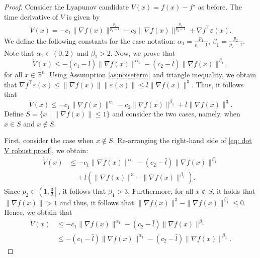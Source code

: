 \documentclass[letterpaper]{article}
\begin{document}
\begin{proof}
Consider the Lyapunov candidate $V(x)=f(x)-f^\star$ as before. The time derivative of $V$ is given by
\begin{align*}
\dot{V}(x) = -c_1\|\nabla f(x)\|^{\frac{p_1}{p_1-1}}-c_2\|\nabla f(x)\|^{\frac{p_2}{p_2-1}}+\nabla f^\intercal \varepsilon(x).
\end{align*}
We define the following constants for the ease notation: $\alpha_1= \frac{p_1}{p_1 -1}$, $\beta_1= \frac{p_2}{p_2 -1}$. Note that $\alpha_1 \in (0,2)$ and $\beta_1 >2$.
Now, we prove that
\begin{equation} \label{eq:robust_bound}
\dot{V}(x)\leq -(c_1 -\bar{l})\|\nabla f(x)\|^{\alpha_1} -(c_2 -\bar{l})\|\nabla f(x)\|^{\beta_1},
\end{equation}
for all $x\in \mathbb{R}^n$.
Using Assumption \ref{as:noiseterm} and triangle inequality, we obtain that $\nabla f^\intercal \varepsilon(x)\leq \|\nabla f(x)\|\|\varepsilon(x)\|\leq \bar{l}\|\nabla f(x)\|^3$. Thus, it follows that
\begin{equation}\label{eq: dot V robust proof}
\dot{V}(x) \leq -c_1 \|\nabla f(x)\|^{\alpha_1} -c_2\|\nabla f(x)\|^{\beta_1} +\bar{l}\|\nabla f(x)\|^3.
\end{equation}
Define $S = \{x\; |\; \|\nabla f(x)\|\leq 1\}$ and consider the two cases, namely, when $x\in S$ and $x\notin S$.

First, consider the case when $x\notin S$. Re-arranging the right-hand side of \eqref{eq: dot V robust proof}, we obtain:
\begin{align*}
\dot{V}(x) &\leq -c_1\|\nabla f(x)\|^{\alpha_1} -(c_2-\bar{l})\|\nabla f(x)\|^{\beta_1} \\ &\quad +\bar{l}\left(\|\nabla f(x)\|^3 -\|\nabla f(x)\|^{\beta_1}\right).
\end{align*}
Since $p_2\in \left(1,\frac{3}{2}\right]$, it follows that $\beta_1>3$. Furthermore, for all $x\notin S$, it holds that $\|\nabla f(x)\|>1$ and thus, it follows that $\|\nabla f(x)\|^3 -\|\nabla f(x)\|^{\beta_1}\leq0$. Hence, we obtain that
\begin{align*}
\dot{V}(x) &\leq -c_1\|\nabla f(x)\|^{\alpha_1} -(c_2-\bar{l})\|\nabla f(x)\|^{\beta_1} \\
&\leq -(c_1 -\bar{l})\|\nabla f(x)\|^{\alpha_1} -(c_2-\bar{l})\|\nabla f(x)\|^{\beta_1}.
\end{align*}


\end{proof}
\end{document}

